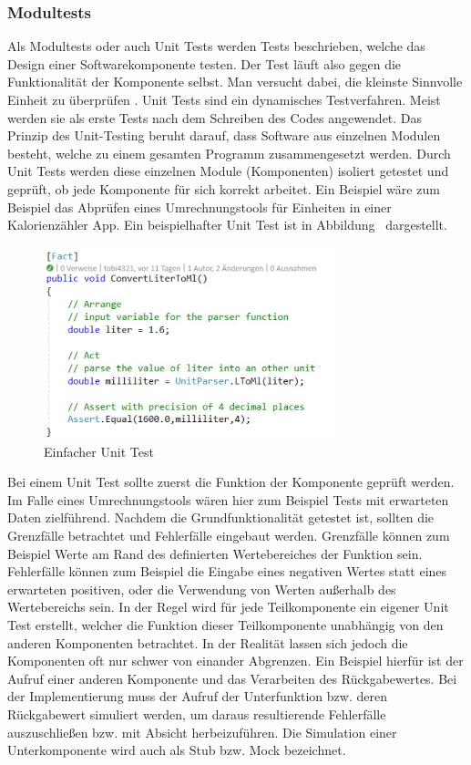 \subsubsection{Modultests}
Als Modultests oder auch Unit Tests werden Tests beschrieben, welche das Design einer Softwarekomponente testen. Der Test läuft also gegen die Funktionalität der Komponente selbst. Man versucht dabei, die kleinste Sinnvolle Einheit zu überprüfen \cite{Grunfelder.2017}. Unit  Tests sind ein dynamisches Testverfahren. Meist werden sie als erste Tests nach dem Schreiben des Codes angewendet. Das Prinzip des Unit-Testing beruht darauf, dass Software aus einzelnen Modulen besteht, welche zu einem gesamten Programm zusammengesetzt werden. Durch Unit Tests werden diese einzelnen Module (Komponenten) isoliert getestet und geprüft, ob jede Komponente für sich korrekt arbeitet. Ein Beispiel wäre zum Beispiel das Abprüfen eines Umrechnungstools für Einheiten in einer Kalorienzähler App. Ein beispielhafter Unit Test ist in Abbildung \dq {}\dq~dargestellt.\newpage
\begin{figure}[h]
  \centering
   \includegraphics[width=0.75\textwidth]{img/UnitTest_Einfach.jpg} 
   \caption[Einfacher Unit Test]{ Einfacher Unit Test \cite{MarvinBock.2021}}
   \label{fig:UnitTest_Einfach.jpg}
\end{figure}
Bei einem Unit Test sollte zuerst die Funktion der Komponente geprüft werden. Im  Falle eines Umrechnungstools wären hier zum Beispiel Tests mit erwarteten Daten zielführend. Nachdem die Grundfunktionalität getestet ist, sollten die Grenzfälle betrachtet und Fehlerfälle eingebaut werden. Grenzfälle können zum Beispiel Werte am Rand des definierten Wertebereiches der Funktion sein. Fehlerfälle können zum Beispiel die Eingabe eines negativen Wertes statt eines erwarteten positiven, oder die Verwendung von Werten außerhalb des Wertebereichs sein. In der Regel wird für jede Teilkomponente ein eigener Unit Test erstellt, welcher die Funktion dieser Teilkomponente unabhängig von den anderen Komponenten betrachtet. In der Realität lassen sich jedoch die Komponenten oft nur schwer von einander Abgrenzen. Ein Beispiel hierfür ist der Aufruf einer anderen Komponente und das Verarbeiten des Rückgabewertes. Bei der Implementierung muss der Aufruf der Unterfunktion bzw. deren Rückgabewert simuliert werden, um daraus resultierende Fehlerfälle auszuschließen bzw. mit Absicht herbeizuführen. Die Simulation einer Unterkomponente wird auch als Stub bzw. Mock bezeichnet.\cite{Grunfelder.2017}
